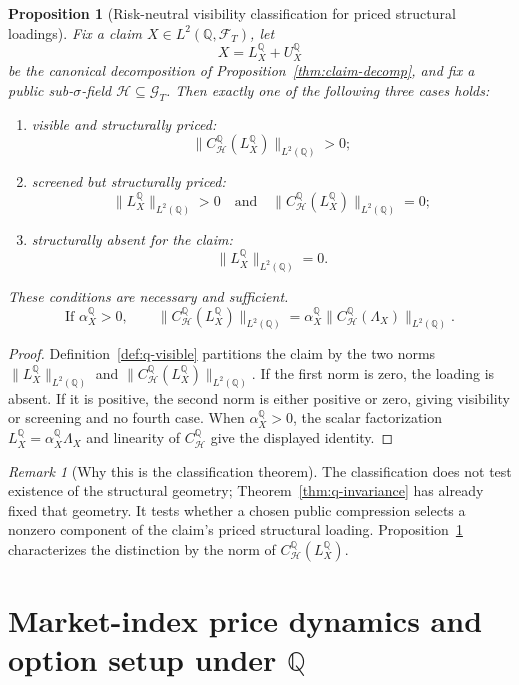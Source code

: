\documentclass[11pt,a4paper]{amsart}
\theoremstyle{plain}
\newtheorem{proposition}[theorem]{Proposition}
\theoremstyle{definition}
\theoremstyle{remark}
\newtheorem{remark}[theorem]{Remark}
\newcommand{\QQ}{\mathbb{Q}}
\newcommand{\cF}{\mathcal{F}}
\newcommand{\cG}{\mathcal{G}}
\newcommand{\cH}{\mathcal{H}}
\begin{document}
\begin{proposition}[Risk-neutral visibility classification for priced structural loadings]\label{thm:q-trichotomy}
Fix a claim \(X\in L^2(\QQ,\cF_T)\), let
\[
        X=L_X^\QQ+U_X^\QQ
\]
be the canonical decomposition of Proposition~\ref{thm:claim-decomp}, and fix a public
sub-\(\sigma\)-field \(\cH\subseteq \cG_T\).  Then exactly one of the following three cases holds:
\begin{enumerate}[label=(\roman*)]
\item \emph{visible and structurally priced}:
\[
        \|C_{\cH}^{\QQ}(L_X^\QQ)\|_{L^2(\QQ)}>0;
\]
\item \emph{screened but structurally priced}:
\[
        \|L_X^\QQ\|_{L^2(\QQ)}>0
        \quad\text{and}\quad
        \|C_{\cH}^{\QQ}(L_X^\QQ)\|_{L^2(\QQ)}=0;
\]
\item \emph{structurally absent for the claim}:
\[
        \|L_X^\QQ\|_{L^2(\QQ)}=0.
\]
\end{enumerate}
These conditions are necessary and sufficient.
\[
        \text{If } \alpha_X^\QQ>0,\qquad
        \|C_{\cH}^{\QQ}(L_X^\QQ)\|_{L^2(\QQ)}
        =
        \alpha_X^\QQ \|C_{\cH}^{\QQ}(\Lambda_X)\|_{L^2(\QQ)}.
\]
\end{proposition}

\begin{proof}
Definition~\ref{def:q-visible} partitions the claim by the two norms
\(\|L_X^\QQ\|_{L^2(\QQ)}\) and
\(\|C_{\cH}^{\QQ}(L_X^\QQ)\|_{L^2(\QQ)}\).  If the first norm is zero, the loading is absent.  If it
is positive, the second norm is either positive or zero, giving visibility or screening and no
fourth case.  When \(\alpha_X^\QQ>0\), the scalar factorization
\(
        L_X^\QQ=\alpha_X^\QQ\Lambda_X
\)
and linearity of \(C_{\cH}^{\QQ}\) give the displayed identity.
\end{proof}

\begin{remark}[Why this is the classification theorem]
The classification does not test existence of the structural geometry; Theorem~\ref{thm:q-invariance}
has already fixed that geometry.  It tests whether a chosen public compression selects a nonzero
component of the claim's priced structural loading.  Proposition~\ref{thm:q-trichotomy}
characterizes the distinction by the norm of \(C_{\cH}^{\QQ}(L_X^\QQ)\).
\end{remark}

\section{Market-index price dynamics and option setup under \texorpdfstring{\(\QQ\)}{Q}}\label{sec:qsetup}
\end{document}
